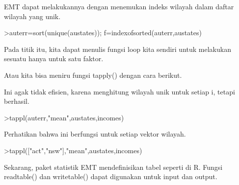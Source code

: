 \documentclass{article}
\begin{document}
\begin{eulernotebook}
\begin{eulercomment}
\begin{eulercomment}
\begin{eulercomment}
EMT dapat melakukannya dengan menemukan indeks wilayah dalam daftar
wilayah yang unik.
\end{eulercomment}
\begin{eulerprompt}
>auterr=sort(unique(austates)); f=indexofsorted(auterr,austates)
\end{eulerprompt}
\begin{euleroutput}
  [6,  5,  4,  2,  2,  3,  8,  8,  4,  7,  2,  7,  4,  4,  5,  6,  5,  3,
  8,  7,  4,  2,  2,  8,  5,  1,  2,  7,  7,  1]
\end{euleroutput}
\begin{eulercomment}
Pada titik itu, kita dapat menulis fungsi loop kita sendiri untuk
melakukan sesuatu hanya untuk satu faktor.

Atau kita bisa meniru fungsi tapply() dengan cara berikut.
\end{eulercomment}
\begin{eulercomment}
Ini agak tidak efisien, karena menghitung wilayah unik untuk setiap i,
tetapi berhasil.
\end{eulercomment}
\begin{eulerprompt}
>tappl(auterr,"mean",austates,incomes)
\end{eulerprompt}
\begin{euleroutput}
  [44.5,  57.3333333333,  55.5,  53.6,  55,  60.5,  56,  52.25]
\end{euleroutput}
\begin{eulercomment}
Perhatikan bahwa ini berfungsi untuk setiap vektor wilayah.
\end{eulercomment}
\begin{eulerprompt}
>tappl(["act","nsw"],"mean",austates,incomes)
\end{eulerprompt}
\begin{euleroutput}
  [44.5,  57.3333333333]
\end{euleroutput}
\begin{eulercomment}
Sekarang, paket statistik EMT mendefinisikan tabel seperti di R.
Fungsi readtable() dan writetable() dapat digunakan untuk input dan
output.


\end{eulercomment}
\end{eulercomment}
\end{eulercomment}
\end{eulernotebook}
\end{document}
